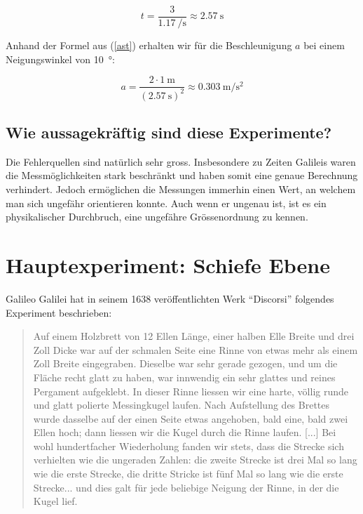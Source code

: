 \documentclass[a4paper, titlepage]{article}
\newcommand{\accunit}[1]{\SI{#1}{\metre\per\square\second}}
\begin{document}
    \begin{equation}
        t = \frac{3}{\SI{1.17}{\per\second}} \approx \SI{2.57}{\second}
    \end{equation}

    Anhand der Formel aus (\ref{ast}) erhalten wir für die Beschleunigung $a$
    bei einem Neigungswinkel von \SI{10}{\degree}:

    \begin{equation}
        a = \frac{2 \cdot \SI{1}{\metre}}{(\SI{2.57}{\second})^2} \approx \accunit{0.303}
    \end{equation}
    
    \subsection{Wie aussagekräftig sind diese Experimente?}
    Die Fehlerquellen sind natürlich sehr gross. Insbesondere zu Zeiten 
    Galileis waren die Messmöglichkeiten stark beschränkt und haben somit
    eine genaue Berechnung verhindert. Jedoch ermöglichen die Messungen
    immerhin einen Wert, an welchem man sich ungefähr orientieren konnte.
    Auch wenn er ungenau ist, ist es ein physikalischer Durchbruch, eine
    ungefähre Grössenordnung zu kennen.


    \section{Hauptexperiment: Schiefe Ebene}

    Galileo Galilei hat in seinem 1638 veröffentlichten Werk ``Discorsi''
    folgendes Experiment beschrieben:
    \begin{quote}
    Auf einem Holzbrett von 12 Ellen Länge, einer halben Elle Breite
    und drei Zoll Dicke war auf der schmalen Seite eine Rinne von
    etwas mehr als einem Zoll Breite eingegraben. Dieselbe war sehr
    gerade gezogen, und um die Fläche recht glatt zu haben, war
    innwendig ein sehr glattes und reines Pergament aufgeklebt.
    In dieser Rinne liessen wir eine harte, völlig runde und glatt
    polierte Messingkugel laufen. Nach Aufstellung des Brettes
    wurde dasselbe auf der einen Seite etwas angehoben,
    bald eine, bald zwei Ellen hoch; dann liessen wir die Kugel durch die
    Rinne laufen. [...] 
    Bei wohl hundertfacher Wiederholung fanden wir stets, 
    dass die Strecke sich verhielten wie die ungeraden Zahlen: 
    die zweite Strecke ist drei Mal so lang wie die erste Strecke, 
    die dritte Stricke ist fünf Mal so lang wie die erste Strecke... 
    und dies galt für jede beliebige Neigung der Rinne, in der die Kugel 
    lief. \cite[Galileo Galilei, Discorsi, 1638]{physicsbook}
    \end{quote}
\end{document}
